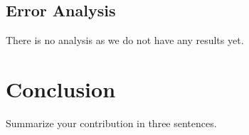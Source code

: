 \documentclass[11pt,a4paper]{article}
\begin{document}
\subsection{Error Analysis}
There is no analysis as we do not have any results yet.

\section{Conclusion}
Summarize your contribution in three sentences.



\end{document}
